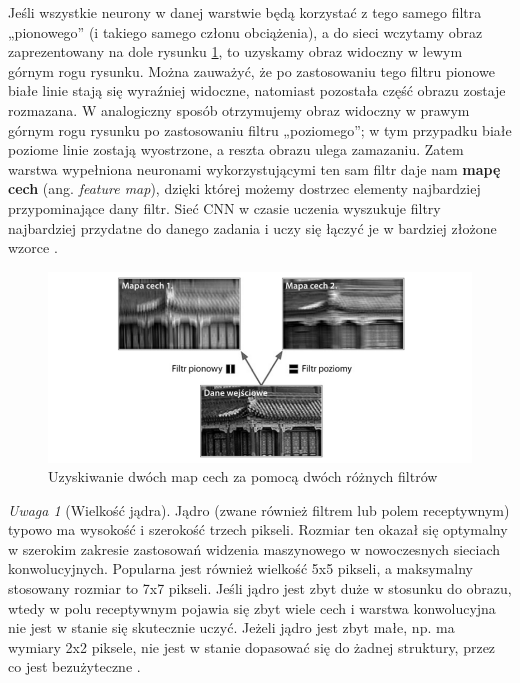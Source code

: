 \documentclass[12pt]{mwbk}
\theoremstyle{plain}
\theoremstyle{definition}
\theoremstyle{remark}
\newtheorem{uwaga}{Uwaga}[chapter]
\newcommand\zrodlo[1]{\par\vspace{-3mm}{\small\textit{Źródło: }#1 }}
\begin{document}
Jeśli wszystkie neurony w danej warstwie będą korzystać z tego samego filtra „pionowego” (i takiego
samego członu obciążenia), a do sieci wczytamy obraz zaprezentowany na dole rysunku \ref{fig:filtry},
to uzyskamy obraz widoczny w lewym górnym rogu rysunku. Można zauważyć, że po zastosowaniu tego filtru
pionowe białe linie stają się wyraźniej widoczne, natomiast pozostała część obrazu zostaje rozmazana.
W analogiczny sposób otrzymujemy obraz widoczny w prawym górnym rogu rysunku po zastosowaniu filtru „poziomego”; w tym przypadku białe poziome linie zostają wyostrzone, a reszta obrazu ulega zamazaniu. Zatem warstwa wypełniona neuronami wykorzystującymi ten sam filtr daje nam \textbf{mapę cech} (ang. \emph{feature map}), dzięki której możemy dostrzec elementy najbardziej przypominające dany filtr. Sieć CNN w czasie uczenia wyszukuje filtry najbardziej przydatne do danego zadania i uczy się łączyć je w bardziej złożone wzorce \cite{geron}.

\begin{figure}[!h]
	\centering
	\includegraphics[width=0.9\linewidth]{rys/cnn_filtry.png}
	\caption{Uzyskiwanie dwóch map cech za pomocą dwóch różnych filtrów}
	\zrodlo{\cite{geron}}
	\label{fig:filtry}
\end{figure}

\begin{uwaga}[Wielkość jądra]
	Jądro (zwane również filtrem lub polem receptywnym) typowo ma wysokość i szerokość trzech pikseli. Rozmiar ten okazał się optymalny w szerokim zakresie zastosowań widzenia maszynowego w nowoczesnych sieciach konwolucyjnych. Popularna jest również wielkość 5x5 pikseli, a maksymalny stosowany rozmiar to 7x7 pikseli. Jeśli jądro jest zbyt duże w stosunku do obrazu, wtedy w polu receptywnym pojawia się zbyt wiele cech i warstwa konwolucyjna nie jest w stanie się skutecznie uczyć. Jeżeli jądro jest zbyt małe, np. ma wymiary 2x2 piksele, nie jest w stanie dopasować się do żadnej struktury, przez co jest bezużyteczne \cite{illustrated}.
\end{uwaga}
\end{document}
